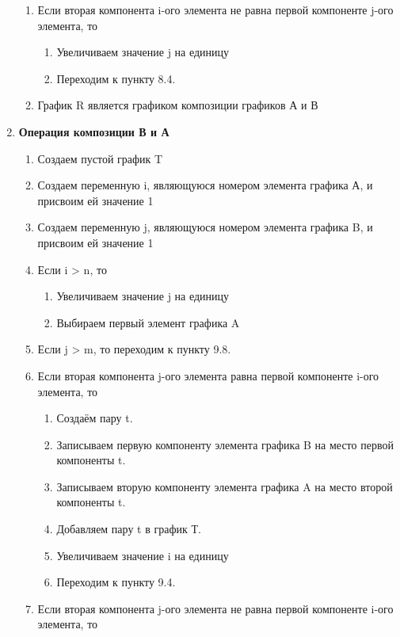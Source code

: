 \documentclass[a4paper,12pt]{extarticle}
\begin{document}
\begin{enumerate}
\begin{enumerate}[label*=\arabic*.]
    \item Если вторая компонента i-ого элемента не равна первой компоненте j-ого элемента, то
        \begin{enumerate}[label*=\arabic*.]
            \item Увеличиваем значение j на единицу
            \item Переходим к пункту 8.4.
        \end{enumerate}
    \item График R является графиком композиции графиков А и В
    \end{enumerate}
  \item \textbf{Операция композиции В и А}
    \begin{enumerate}[label*=\arabic*.]
        \item Создаем пустой график T
        \item Создаем переменную i, являющуюся номером элемента графика А, и присвоим ей значение 1
        \item Создаем переменную j, являющуюся номером элемента графика B, и присвоим ей значение 1
        \item Если i > n, то
        \begin{enumerate}[label*=\arabic*.]
            \item Увеличиваем значение j на единицу
            \item Выбираем первый элемент графика A
        \end{enumerate}
        \item Если j > m, то переходим к пункту 9.8.
        \item Если вторая компонента j-ого элемента равна первой компоненте i-ого элемента, то
        \begin{enumerate}[label*=\arabic*.]
            \item Создаём пару t.
            \item Записываем первую компоненту элемента графика B на место первой компоненты t.
            \item Записываем вторую компоненту элемента графика A на место второй компоненты t.
            \item Добавляем пару t в график Т.
            \item Увеличиваем значение i на единицу
            \item Переходим к пункту 9.4.
        \end{enumerate}
        \item Если вторая компонента j-ого элемента не равна первой компоненте i-ого элемента, то

\end{enumerate}
\end{enumerate}
\end{document}
